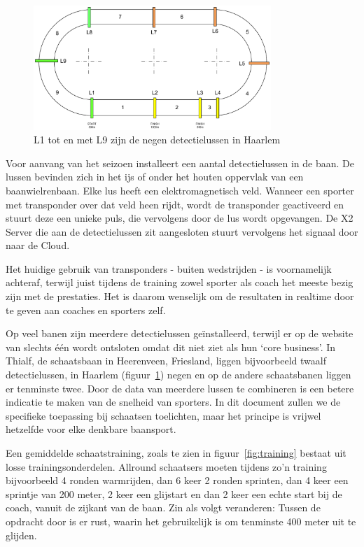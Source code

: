\begin{figure}
  \begin{center}
    \includegraphics[width=0.8\textwidth]{style/images/BaanoverzichtHaarlem}
  \end{center}
  \caption{L1 tot en met L9 zijn de negen \mylaps detectielussen in Haarlem}
  \label{fig:track-transponders}
\end{figure}

Voor aanvang van het seizoen installeert \mylaps een aantal detectielussen in de baan. De lussen bevinden zich in het ijs of onder het houten oppervlak van een baanwielrenbaan. Elke lus heeft een elektromagnetisch veld. Wanneer een sporter met transponder over dat veld heen rijdt, wordt de transponder geactiveerd en stuurt deze een unieke puls, die vervolgens door de lus wordt opgevangen. De \mylaps X2 Server die aan de detectielussen zit aangesloten stuurt vervolgens het signaal door naar de \mylaps Cloud.

Het huidige gebruik van transponders - buiten wedstrijden - is voornamelijk achteraf, terwijl juist tijdens de training zowel sporter als coach het meeste bezig zijn met de prestaties. Het is daarom wenselijk om de resultaten in realtime door te geven aan coaches en sporters zelf.

Op veel banen zijn meerdere detectielussen geïnstalleerd, terwijl er op de website van \mylaps slechts één wordt ontsloten omdat \mylaps dit niet ziet als hun `core business'. In Thialf, de schaatsbaan in Heerenveen, Friesland, liggen bijvoorbeeld twaalf detectielussen, in Haarlem (figuur~\ref{fig:track-transponders}) negen en op de andere schaatsbanen liggen er tenminste twee. Door de data van meerdere lussen te combineren is een betere indicatie te maken van de snelheid van sporters. In dit document zullen we de specifieke toepassing bij schaatsen toelichten, maar het principe is vrijwel hetzelfde voor elke denkbare baansport.

Een gemiddelde schaatstraining, zoals te zien in figuur~\ref{fig:training} bestaat uit losse trainingsonderdelen. Allround schaatsers moeten tijdens zo'n training bijvoorbeeld 4 ronden warmrijden, dan 6 keer 2 ronden sprinten, dan 4 keer een sprintje van 200 meter, 2 keer een glijstart en dan 2 keer een echte start bij de coach, vanuit de zijkant van de baan. Zin als volgt veranderen: Tussen de opdracht door is er rust, waarin het gebruikelijk is om tenminste 400 meter uit te glijden.

